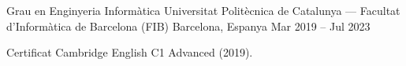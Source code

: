 
\begin{cventries}

\cventry
{Grau en Enginyeria Informàtica}
{Universitat Politècnica de Catalunya --- Facultat d'Informàtica de Barcelona (FIB)}
{Barcelona, Espanya}
{Mar 2019 -- Jul 2023}
{
  \begin{cvitems}
    \item {Certificat Cambridge English C1 Advanced (2019).}
  \end{cvitems}
}
\end{cventries}
